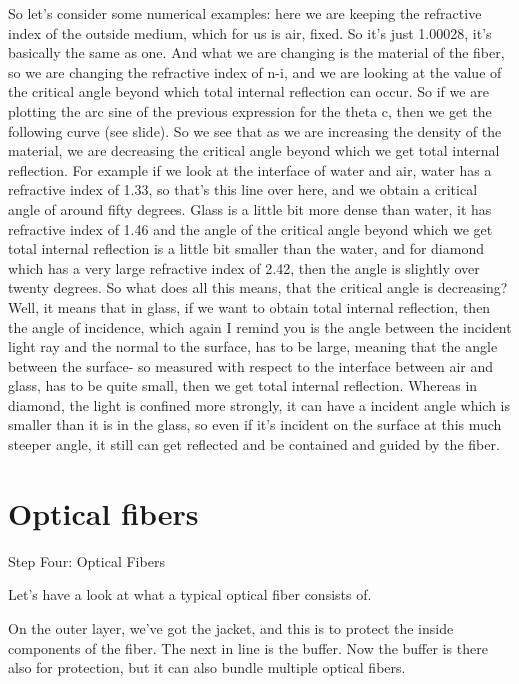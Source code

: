 So let's consider some numerical examples: here we are keeping the refractive index of the outside medium, which for us is air, fixed. So it's just 1.00028, it's basically the same as one. And what we are changing is the material of the fiber, so we are changing the refractive index of n-i, and we are looking at the value of the critical angle beyond which total internal reflection can occur. So if we are plotting the arc sine of the previous expression for the theta c, then we get the following curve (see slide). So we see that as we are increasing the density of the material, we are decreasing the critical angle beyond which we get total internal reflection. For example if we look at the interface of water and air, water has a refractive index of 1.33, so that's this line over here, and we obtain a critical angle of around fifty degrees. Glass is a little bit more dense than water, it has refractive index of 1.46 and the angle of the critical angle beyond which we get total internal reflection is a little bit smaller than the water, and for diamond which has a very large refractive index of 2.42, then the angle is slightly over twenty degrees. So what does all this means, that the critical angle is decreasing? Well, it means that in glass, if we want to obtain total internal reflection, then the angle of incidence, which again I remind you is the angle between the incident light ray and the normal to the surface, has to be large, meaning that the angle between the surface- so measured with respect to the interface between air and glass, has to be quite small, then we get total internal reflection. Whereas in diamond, the light is confined more strongly, it can have a incident angle which is smaller than it is in the glass, so even if it's incident on the surface at this much steeper angle, it still can get reflected and be contained and guided by the fiber.



\section{Optical fibers}

Step Four: Optical Fibers

Let's have a look at what a typical optical fiber consists of.

On the outer layer, we've got the jacket, and this is to protect the inside components of the fiber. The next in line is the buffer. Now the buffer is there also for protection, but it can also bundle multiple optical fibers.

